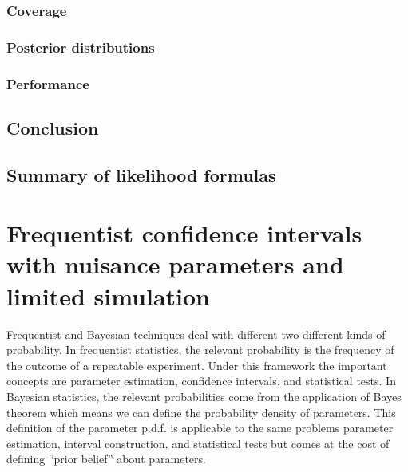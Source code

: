 \subsubsection{Coverage\label{sec:coverage}}
\begingroup
\graphicspath{{results/mcllh_paper/}}

\endgroup

\subsubsection{Posterior distributions\label{sec:posterior}}
\begingroup
\graphicspath{{results/mcllh_paper/}}

\endgroup

\subsubsection{Performance\label{sec:performance}}
\begingroup
\graphicspath{{results/mcllh_paper/}}

\endgroup

\subsection{Conclusion\label{sec:llhconclusion}}
\begingroup
\graphicspath{{results/mcllh_paper/}}

\endgroup

\subsection{Summary of likelihood formulas\label{sec:llhtable}}
\begingroup
\graphicspath{{results/mcllh_paper/}}

\endgroup
\FloatBarrier
\section{Frequentist confidence intervals with nuisance parameters and limited simulation}\label{sec:low_stats_confidence_intervals}

Frequentist and Bayesian techniques deal with different two different kinds of probability.
In frequentist statistics, the relevant probability is the frequency of the outcome of a repeatable experiment.
Under this framework the important concepts are parameter estimation, confidence intervals, and statistical tests.
In Bayesian statistics, the relevant probabilities come from the application of Bayes theorem which means we can define the probability density of parameters.
This definition of the parameter p.d.f. is applicable to the same problems parameter estimation, interval construction, and statistical tests but comes at the cost of defining ``prior belief'' about parameters.

